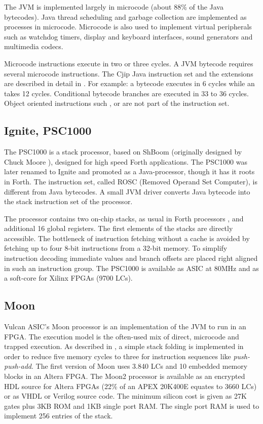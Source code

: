 The JVM is implemented largely in microcode (about 88\% of the Java
bytecodes). Java thread scheduling and garbage collection are
implemented as processes in microcode. Microcode is also used to
implement virtual peripherals such as watchdog timers, display and
keyboard interfaces, sound generators and multimedia codecs.

Microcode instructions execute in two or three cycles. A JVM
bytecode requires several microcode instructions. The Cjip Java
instruction set and the extensions are described in detail in
\cite{CjipRef}. For example: a bytecode  executes in 6
cycles while an  takes 12 cycles. Conditional bytecode
branches are executed in 33 to 36 cycles. Object oriented
instructions such ,  or
 are not part of the instruction set.


\subsection{Ignite, PSC1000}

The PSC1000 \cite{IGNITE} is a stack processor, based on ShBoom
(originally designed by Chuck Moore \cite{ShBoom}), designed for
high speed Forth applications. The PSC1000 was later renamed to
Ignite and promoted as a Java-processor, though it has it roots in
Forth. The instruction set, called ROSC (Removed Operand Set
Computer), is different from Java bytecodes. A small JVM driver
converts Java bytecode into the stack instruction set of the
processor.


The processor contains two on-chip stacks, as usual in Forth
processors \cite{Koopman89}, and additional 16 global registers. The
first elements of the stacks are directly accessible. The bottleneck
of instruction fetching without a cache is avoided by fetching up to
four 8-bit instructions from a 32-bit memory. To simplify
instruction decoding immediate values and branch offsets are placed
right aligned in such an instruction group. The PSC1000 is available
as ASIC at 80MHz and as a soft-core for Xilinx FPGAs (9700 LCs).


\subsection{Moon}

Vulcan ASIC's Moon processor is an implementation of the JVM to run
in an FPGA. The execution model is the often-used mix of direct,
microcode and trapped execution. As described in \cite{Vulcan2000},
a simple stack folding is implemented in order to reduce five memory
cycles to three for instruction sequences like
\textit{push-push-add}. The first version of Moon uses 3.840 LCs and
10 embedded memory blocks in an Altera FPGA. The Moon2 processor
\cite{Vulcan2003} is available as an encrypted HDL source for Altera
FPGAs (22\% of an APEX 20K400E equates to 3660 LCs) or as VHDL or
Verilog source code. The minimum silicon cost is given as 27K gates
plus 3KB ROM and 1KB single port RAM. The single port RAM is used to
implement 256 entries of the stack.


